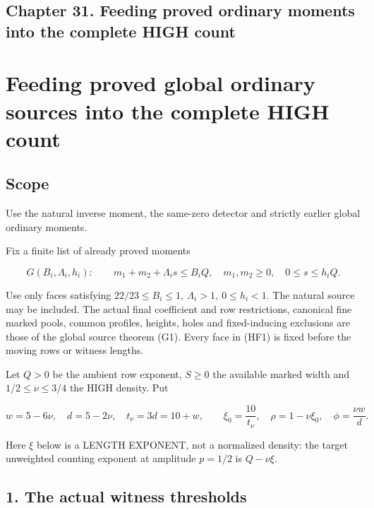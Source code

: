 \hypertarget{feedback:chapter-31.-feeding-proved-ordinary-moments-into-the-complete-high-count}{%
\subsection{Chapter 31. Feeding proved ordinary moments into the complete HIGH count}\label{feedback:chapter-31.-feeding-proved-ordinary-moments-into-the-complete-high-count}}

\hypertarget{feedback:feeding-proved-global-ordinary-sources-into-the-complete-high-count}{%
\section{Feeding proved global ordinary sources into the complete HIGH count}\label{feedback:feeding-proved-global-ordinary-sources-into-the-complete-high-count}}

\hypertarget{feedback:scope}{%
\subsection{Scope}\label{feedback:scope}}

Use the natural inverse moment, the same-zero detector and strictly earlier global ordinary moments.

Fix a finite list of already proved moments

\[
 G(B_i,\Lambda_i,h_i):\qquad
 m_1+m_2+\Lambda_i s\le B_i Q,\quad
 m_1,m_2\ge0,\quad 0\le s\le h_iQ.
\tag{HF1}
\]

Use only faces satisfying \(22/23\le B_i\le1,\ \Lambda_i>1,\ 0\le h_i<1\). The natural source may be included. The actual final coefficient and row restrictions, canonical fine marked pools, common profiles, heights, holes and fixed-inducing exclusions are those of the global source theorem (G1). Every face in (HF1) is fixed before the moving rows or witness lengths.

Let \(Q>0\) be the ambient row exponent, \(S\ge0\) the available marked width and \(1/2\le\nu\le3/4\) the HIGH density. Put

\[
 w=5-6\nu,\quad d=5-2\nu,\quad t_\nu=3d=10+w,\qquad
 \xi_0=\frac{10}{t_\nu},\quad
 \rho=1-\nu\xi_0,\quad \phi=\frac{\nu w}{d}.
\tag{HF2}
\]

Here \(\xi\) below is a LENGTH EXPONENT, not a normalized density: the target unweighted counting exponent at amplitude \(p=1/2\) is \(Q-\nu\xi\).

\hypertarget{feedback:the-actual-witness-thresholds}{%
\subsection{1. The actual witness thresholds}\label{feedback:the-actual-witness-thresholds}}

